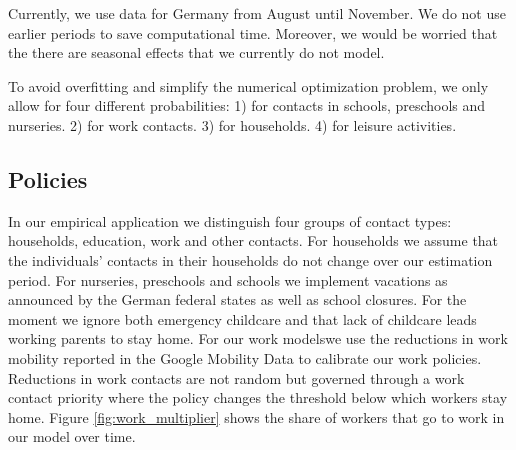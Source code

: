 Currently, we use data for Germany from August until November. We do not use earlier
periods to save computational time. Moreover, we would be worried that the there are
seasonal effects that we currently do not model.

To avoid overfitting and simplify the numerical optimization problem, we only allow for
four different probabilities: 1) for contacts in schools, preschools and nurseries. 2)
for work contacts. 3) for households. 4) for leisure activities.

\subsection{Policies}

\FloatBarrier

In our empirical application we distinguish four groups of contact types: households,
education, work and other contacts. For households we assume that the individuals'
contacts in their households do not change over our estimation period. For nurseries,
preschools and schools we implement vacations as announced by the German federal states
as well as school closures. For the moment we ignore both emergency childcare and that
lack of childcare leads working parents to stay home.
%
%
%
%
For our work models\footnotemark we use the reductions in work mobility reported in the
Google Mobility Data \citep{Google2021} to calibrate our work policies.
Reductions in work contacts are not random but governed through a work contact priority
where the policy changes the threshold below which workers stay home.
Figure \ref{fig:work_multiplier} shows the share of workers that go to work in our model
over time.

